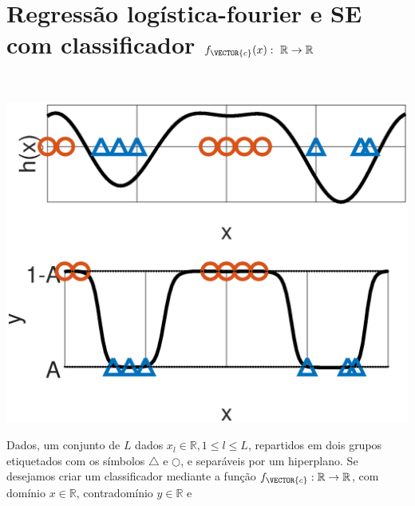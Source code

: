 \newpage


\section{Regressão logística-fourier e SE com classificador $f_{\VECTOR{c}}(x):~\mathbb{R} \rightarrow \mathbb{R}$}
\label{sec:theo:reglogr1r1fourier:1}


\begin{theorem}\label{theo:reglogr1r1fourier:1}
~\\
\noindent
\begin{minipage}{0.45\textwidth}
\centering
\includegraphics[width=0.95\linewidth]{chapters/classificacao/mfiles/reglogr1r1fourier/reglogr1r1fourier.eps} 
\end{minipage}
\begin{minipage}{0.55\textwidth}
Dados, um conjunto de $L$ dados $x_l \in \mathbb{R}, 1 \leq l \leq L$,
repartidos em dois grupos etiquetados com os símbolos $\bigtriangleup$ e $\bigcirc$, 
e separáveis por um hiperplano.
Se desejamos criar um classificador mediante 
a função  $f_{\VECTOR{c}}:\mathbb{R} \rightarrow \mathbb{R}$,
com domínio $x \in \mathbb{R}$, contradomínio $y \in \mathbb{R}$ e 

\end{minipage}
\end{theorem}
